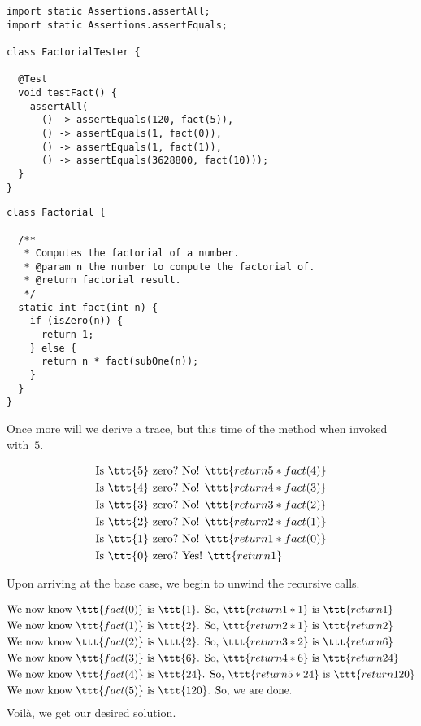 \enlargethispage{-5\baselineskip}
\begin{lstlisting}[language=MyJava]
import static Assertions.assertAll;
import static Assertions.assertEquals;

class FactorialTester {
  
  @Test
  void testFact() {
    assertAll(
      () -> assertEquals(120, fact(5)),
      () -> assertEquals(1, fact(0)),
      () -> assertEquals(1, fact(1)),
      () -> assertEquals(3628800, fact(10)));
  }
}
\end{lstlisting}
\begin{lstlisting}[language=MyJava]
class Factorial {

  /**
   * Computes the factorial of a number.
   * @param n the number to compute the factorial of.
   * @return factorial result.
   */
  static int fact(int n) {
    if (isZero(n)) {
      return 1;
    } else {
      return n * fact(subOne(n));
    }
  }
}
\end{lstlisting}

Once more will we derive a trace, but this time of the  method when invoked with~$5$.

\begin{align*}
    \text{Is }\ttt{5} \text{ zero?} &\text{ No! }\ttt{return 5 * fact(4)}\\
    \text{Is }\ttt{4} \text{ zero?} &\text{ No! }\ttt{return 4 * fact(3)}\\
    \text{Is }\ttt{3} \text{ zero?} &\text{ No! }\ttt{return 3 * fact(2)}\\
    \text{Is }\ttt{2} \text{ zero?} &\text{ No! }\ttt{return 2 * fact(1)}\\
    \text{Is }\ttt{1} \text{ zero?} &\text{ No! }\ttt{return 1 * fact(0)}\\
    \text{Is }\ttt{0} \text{ zero?} &\text{ Yes! }\ttt{return 1}
\end{align*}

Upon arriving at the base case, we begin to unwind the recursive calls.

\begin{align*}
    &\text{We now know }\ttt{fact(0)} \text{ is }\ttt{1}\text{. So, } \ttt{return 1 * 1} \text{ is } \ttt{return 1}\\
    &\text{We now know }\ttt{fact(1)} \text{ is }\ttt{2}\text{. So, } \ttt{return 2 * 1} \text{ is } \ttt{return 2}\\
    &\text{We now know }\ttt{fact(2)} \text{ is }\ttt{2}\text{. So, } \ttt{return 3 * 2} \text{ is } \ttt{return 6}\\
    &\text{We now know }\ttt{fact(3)} \text{ is }\ttt{6}\text{. So, } \ttt{return 4 * 6} \text{ is } \ttt{return 24}\\
    &\text{We now know }\ttt{fact(4)} \text{ is }\ttt{24}\text{. So, } \ttt{return 5 * 24} \text{ is } \ttt{return 120}\\
    &\text{We now know }\ttt{fact(5)} \text{ is }\ttt{120}\text{. So, } \text{we are done.} 
\end{align*}
Voil\`a, we get our desired solution.


